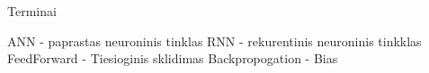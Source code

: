 Terminai

ANN - paprastas neuroninis tinklas
RNN - rekurentinis neuroninis tinkklas
FeedForward - Tiesioginis sklidimas
Backpropogation -
Bias
